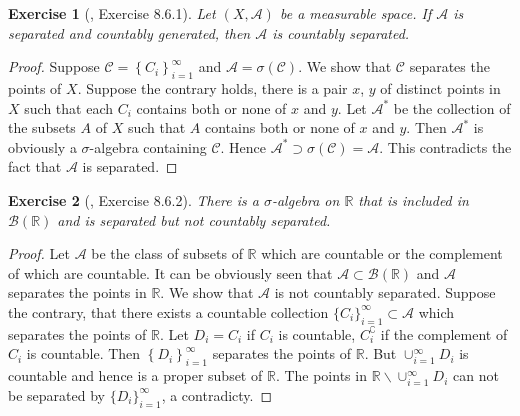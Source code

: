 \documentclass[11pt]{article}
\theoremstyle{plain}
\newtheorem{exercise}{Exercise}
\theoremstyle{definition}
\theoremstyle{remark}
\begin{document}
\begin{exercise}[\cite{book:992991}, Exercise 8.6.1]
    Let $(X, \mathscr A)$ be a measurable space. If $\mathscr A$ is separated and countably generated, then $\mathscr A$ is countably separated.
\end{exercise}
\begin{proof}
    Suppose $\mathscr C = \left\{ C_i \right\}_{i=1}^\infty $ and $\mathscr A = \sigma(\mathscr C)$.
    We show that $\mathscr C$ separates the points of $X$.
    Suppose the contrary holds, there is a pair $x$, $y$ of distinct points in $X$ such that each $C_i$ contains both or none of $x$ and $y$.
    Let $\mathscr A^*$ be the collection of the subsets $A$ of $X$ such that $A$ contains both or none of $x$ and $y$.
    Then $\mathscr A^*$ is obviously a $\sigma$-algebra containing $\mathscr C$.
    Hence $\mathscr A^* \supset \sigma(\mathscr C) = \mathscr A$.
    This contradicts the fact that $\mathscr A$ is separated.
\end{proof}

\begin{exercise}[\cite{book:992991}, Exercise 8.6.2]
    There is a $\sigma$-algebra on $\mathbb R$ that is included in $\mathscr B (\mathbb R)$ and is separated but not countably separated.
\end{exercise}
\begin{proof}
    Let $\mathscr A$ be the class of subsets of $\mathbb R$ which are countable or the complement of which are countable.
    It can be obviously seen that $\mathscr A \subset \mathscr B (\mathbb R)$ and $\mathscr A$ separates the points in $\mathbb R$.
    We show that $\mathscr A$ is not countably separated.
    Suppose the contrary, that there exists a countable collection $\{C_i\}_{i=1}^\infty \subset \mathscr A$ which separates the points of $\mathbb R$.
    Let $D_i= C_i$ if $C_i$ is countable, $C_i^\complement$ if the complement of $C_i$ is countable.
    Then $\left\{ D_i \right\}_{i=1}^\infty$ separates the points of $\mathbb R$.
    But $\cup_{i=1}^\infty D_i $ is countable and hence is a proper subset of $\mathbb R$.
    The points in $\mathbb R \backslash \cup_{i=1}^\infty D_i $ can not be separated by $\{D_i\}_{i=1}^\infty$, a contradicty.
\end{proof}






\end{document}
